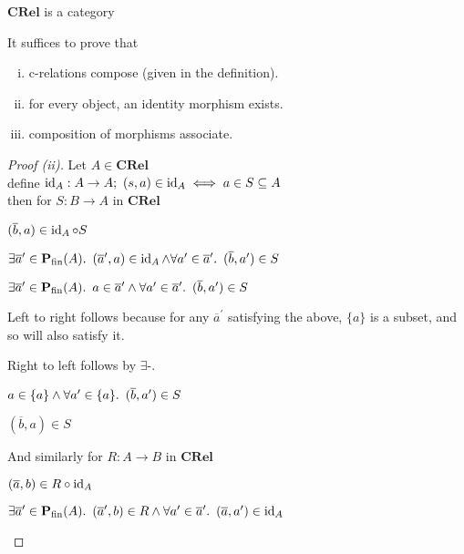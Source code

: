 \begin{prop}
  $\mathbf{CRel}$ is a category

  It suffices to prove that
  \begin{enumerate}[(i)]
    \item c-relations compose (given in the definition).

    \item for every object, an identity morphism exists.

    \item composition of morphisms associate.
  \end{enumerate}
  \begin{proof}[Proof (ii)]
    Let $A\in\mathbf{CRel}$\\[1em]
    \noindent define $\operatorname{id}_A : A\to A;~(s, a)\in \operatorname{id}_A \iff a\in S\subseteq A$\\[1em]
    \noindent then for $S : B\to A$ in $\mathbf{CRel}$

    \begin{itemize}
      \step
        $(\overline{b}, a)\in \operatorname{id}_A\circ S$

      \step[\iffs]
        $\exists\overline{a}^\prime\in\mathbf{P}_{\operatorname{fin}}(A)\ldotp~(\overline{a}^\prime,a)\in\operatorname{id}_A\land \forall a^\prime\in\overline{a}^\prime\ldotp~(\overline{b},a^\prime)\in S$

      \step[\iffs]
        $\exists\overline{a}^\prime\in\mathbf{P}_{\operatorname{fin}}(A)\ldotp~a\in\overline{a}^\prime\land \forall a^\prime\in\overline{a}^\prime\ldotp~(\overline{b},a^\prime)\in S$

      \step
        Left to right follows because for any $\overline{a}^\prime$ satisfying the above, $\{a\}$ is a subset, and so will also satisfy it.

      \step
        Right to left follows by $\exists$-\Intro.

      \step[\iffs]
        $a\in\{a\}\land\forall a^\prime\in\{a\}\ldotp~(\overline{b},a^\prime)\in S$

      \step[\iffs]
        $(\overline{b},a)\in S$
    \end{itemize}

    And similarly for $R : A\to B$ in $\mathbf{CRel}$

    \begin{itemize}
      \step
        $(\overline{a}, b)\in R\circ \operatorname{id}_A$

      \step[\iffs]
        $\exists\overline{a}^\prime\in\mathbf{P}_{\operatorname{fin}}(A)\ldotp~(\overline{a}^\prime,b)\in R\land\forall a^\prime\in\overline{a}^\prime\ldotp~(\overline{a}, a^\prime)\in\operatorname{id}_A$


\end{itemize}
\end{proof}
\end{prop}
